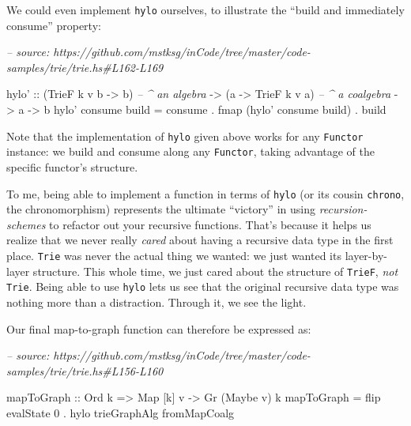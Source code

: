 \documentclass[]{article}
\newenvironment{Shaded}{}{}
\newcommand{\CommentTok}[1]{\textcolor[rgb]{0.38,0.63,0.69}{\textit{#1}}}
\newcommand{\DataTypeTok}[1]{\textcolor[rgb]{0.56,0.13,0.00}{#1}}
\newcommand{\DecValTok}[1]{\textcolor[rgb]{0.25,0.63,0.44}{#1}}
\newcommand{\FunctionTok}[1]{\textcolor[rgb]{0.02,0.16,0.49}{#1}}
\newcommand{\NormalTok}[1]{#1}
\newcommand{\OtherTok}[1]{\textcolor[rgb]{0.00,0.44,0.13}{#1}}
\begin{document}
We could even implement \texttt{hylo} ourselves, to illustrate the ``build and
immediately consume'' property:

\begin{Shaded}
\begin{Highlighting}[]
\CommentTok{-- source: https://github.com/mstksg/inCode/tree/master/code-samples/trie/trie.hs#L162-L169}

\NormalTok{hylo'}
\OtherTok{    ::}\NormalTok{ (}\DataTypeTok{TrieF}\NormalTok{ k v b }\OtherTok{->}\NormalTok{ b)   }\CommentTok{-- ^ an algebra}
    \OtherTok{->}\NormalTok{ (a }\OtherTok{->} \DataTypeTok{TrieF}\NormalTok{ k v a)   }\CommentTok{-- ^ a coalgebra}
    \OtherTok{->}\NormalTok{ a}
    \OtherTok{->}\NormalTok{ b}
\NormalTok{hylo' consume build }\FunctionTok{=}\NormalTok{ consume}
                    \FunctionTok{.}\NormalTok{ fmap (hylo' consume build)}
                    \FunctionTok{.}\NormalTok{ build}
\end{Highlighting}
\end{Shaded}

Note that the implementation of \texttt{hylo} given above works for any
\texttt{Functor} instance: we build and consume along any \texttt{Functor},
taking advantage of the specific functor's structure.

To me, being able to implement a function in terms of \texttt{hylo} (or its
cousin \texttt{chrono}, the chronomorphism) represents the ultimate ``victory''
in using \emph{recursion-schemes} to refactor out your recursive functions.
That's because it helps us realize that we never really \emph{cared} about
having a recursive data type in the first place. \texttt{Trie} was never the
actual thing we wanted: we just wanted its layer-by-layer structure. This whole
time, we just cared about the structure of \texttt{TrieF}, \emph{not}
\texttt{Trie}. Being able to use \texttt{hylo} lets us see that the original
recursive data type was nothing more than a distraction. Through it, we see the
light.

Our final map-to-graph function can therefore be expressed as:

\begin{Shaded}
\begin{Highlighting}[]
\CommentTok{-- source: https://github.com/mstksg/inCode/tree/master/code-samples/trie/trie.hs#L156-L160}

\NormalTok{mapToGraph}
\OtherTok{    ::} \DataTypeTok{Ord}\NormalTok{ k}
    \OtherTok{=>} \DataTypeTok{Map}\NormalTok{ [k] v}
    \OtherTok{->} \DataTypeTok{Gr}\NormalTok{ (}\DataTypeTok{Maybe}\NormalTok{ v) k}
\NormalTok{mapToGraph }\FunctionTok{=}\NormalTok{ flip evalState }\DecValTok{0} \FunctionTok{.}\NormalTok{ hylo trieGraphAlg fromMapCoalg}
\end{Highlighting}
\end{Shaded}
\end{document}
